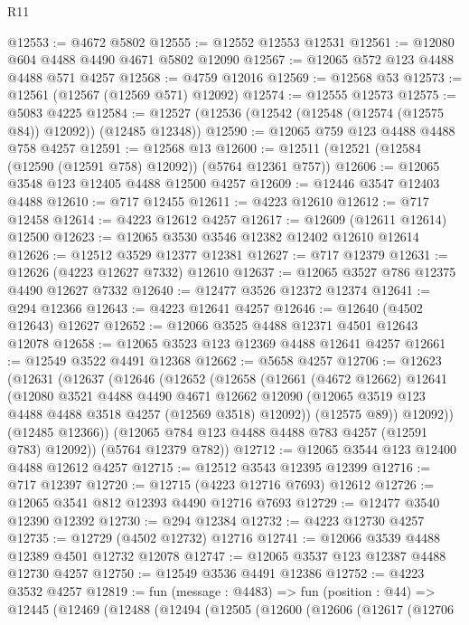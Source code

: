 \begin{lexlean}{R11}
\begin{coremodule}
@12553 := @4672 @5802
@12555 := @12552 @12553 @12531
@12561 := @12080 @604 @4488 @4490 @4671 @5802 @12090
@12567 := @12065 @572 @123 @4488 @4488 @571 @4257
@12568 := @4759 @12016
@12569 := @12568 @53
@12573 := @12561 (@12567 (@12569 @571) @12092)
@12574 := @12555 @12573
@12575 := @5083 @4225
@12584 := @12527 (@12536 (@12542 (@12548 (@12574 (@12575 @84)) @12092)) (@12485 @12348))
@12590 := @12065 @759 @123 @4488 @4488 @758 @4257
@12591 := @12568 @13
@12600 := @12511 (@12521 (@12584 (@12590 (@12591 @758) @12092)) (@5764 @12361 @757))
@12606 := @12065 @3548 @123 @12405 @4488 @12500 @4257
@12609 := @12446 @3547 @12403 @4488
@12610 := @717 @12455
@12611 := @4223 @12610
@12612 := @717 @12458
@12614 := @4223 @12612 @4257
@12617 := @12609 (@12611 @12614) @12500
@12623 := @12065 @3530 @3546 @12382 @12402 @12610 @12614
@12626 := @12512 @3529 @12377 @12381
@12627 := @717 @12379
@12631 := @12626 (@4223 @12627 @7332) @12610
@12637 := @12065 @3527 @786 @12375 @4490 @12627 @7332
@12640 := @12477 @3526 @12372 @12374
@12641 := @294 @12366
@12643 := @4223 @12641 @4257
@12646 := @12640 (@4502 @12643) @12627
@12652 := @12066 @3525 @4488 @12371 @4501 @12643 @12078
@12658 := @12065 @3523 @123 @12369 @4488 @12641 @4257
@12661 := @12549 @3522 @4491 @12368
@12662 := @5658 @4257
@12706 := @12623
    (@12631
      (@12637
        (@12646
          (@12652
            (@12658
              (@12661
                (@4672 @12662)
                @12641
                (@12080
                  @3521
                  @4488
                  @4490
                  @4671
                  @12662
                  @12090
                  (@12065 @3519 @123 @4488 @4488 @3518 @4257 (@12569 @3518) @12092))
                (@12575 @89))
              @12092))
          (@12485 @12366))
        (@12065 @784 @123 @4488 @4488 @783 @4257 (@12591 @783) @12092))
      (@5764 @12379 @782))
@12712 := @12065 @3544 @123 @12400 @4488 @12612 @4257
@12715 := @12512 @3543 @12395 @12399
@12716 := @717 @12397
@12720 := @12715 (@4223 @12716 @7693) @12612
@12726 := @12065 @3541 @812 @12393 @4490 @12716 @7693
@12729 := @12477 @3540 @12390 @12392
@12730 := @294 @12384
@12732 := @4223 @12730 @4257
@12735 := @12729 (@4502 @12732) @12716
@12741 := @12066 @3539 @4488 @12389 @4501 @12732 @12078
@12747 := @12065 @3537 @123 @12387 @4488 @12730 @4257
@12750 := @12549 @3536 @4491 @12386
@12752 := @4223 @3532 @4257
@12819 := fun (message : @4483) =>
  fun (position : @44) =>
  @12445
    (@12469
      (@12488
        (@12494
          (@12505
            (@12600
              (@12606
                (@12617
                  (@12706

\end{coremodule}
\end{lexlean}
